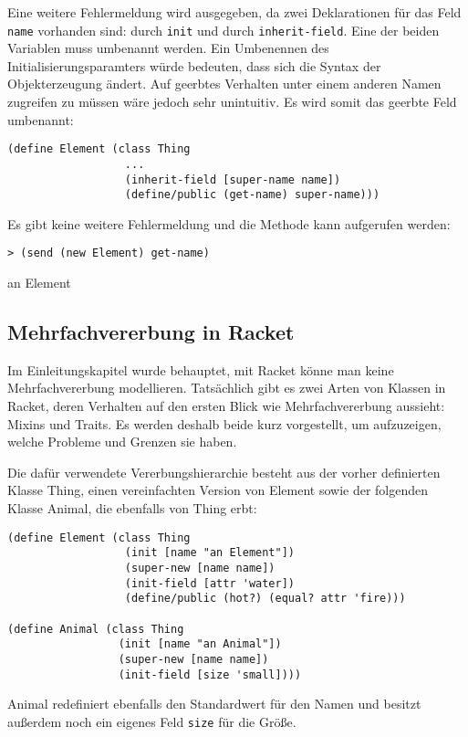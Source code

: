 Eine weitere Fehlermeldung wird ausgegeben, da zwei Deklarationen für das Feld \texttt{name} vorhanden sind: durch \texttt{init} und durch \texttt{inherit-field}. Eine der beiden Variablen muss umbenannt werden. Ein Umbenennen des Initialisierungsparamters würde bedeuten, dass sich die Syntax der Objekterzeugung ändert. Auf geerbtes Verhalten unter einem anderen Namen zugreifen zu müssen wäre jedoch sehr unintuitiv. Es wird somit das geerbte Feld umbenannt:

\begin{lstlisting}
(define Element (class Thing 
                  ...
                  (inherit-field [super-name name])
                  (define/public (get-name) super-name)))
\end{lstlisting}

Es gibt keine weitere Fehlermeldung und die Methode kann aufgerufen werden:

\begin{lstlisting}
> (send (new Element) get-name)
\end{lstlisting}
{\routput {\qq}an Element\qq}

\subsection{Mehrfachvererbung in Racket}
\label{mixins}
Im Einleitungskapitel wurde behauptet, mit Racket könne man keine Mehrfachvererbung modellieren. Tatsächlich gibt es zwei Arten von Klassen in Racket, deren Verhalten auf den ersten Blick wie Mehrfachvererbung aussieht: Mixins und Traits. Es werden deshalb beide kurz vorgestellt, um aufzuzeigen, welche Probleme und Grenzen sie haben.

Die dafür verwendete Vererbungshierarchie besteht aus der vorher definierten Klasse Thing, einen vereinfachten Version von Element sowie der folgenden Klasse Animal, die ebenfalls von Thing erbt:

\begin{lstlisting}
(define Element (class Thing 
                  (init [name "an Element"])
                  (super-new [name name])
                  (init-field [attr 'water])
                  (define/public (hot?) (equal? attr 'fire)))

(define Animal (class Thing
                 (init [name "an Animal"])
                 (super-new [name name])
                 (init-field [size 'small])))
\end{lstlisting}

Animal redefiniert ebenfalls den Standardwert für den Namen und besitzt außerdem noch ein eigenes Feld \texttt{size} für die Größe.

